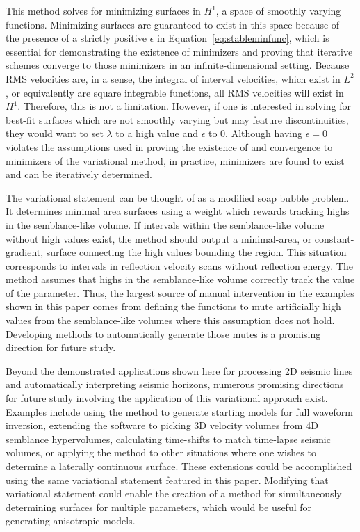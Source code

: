 This method solves for minimizing surfaces in $H^1$, a space of smoothly varying functions.  Minimizing surfaces are guaranteed to exist in this space because of the presence of a strictly positive $\epsilon$ in Equation~\ref{eq:stableminfunc}, which is essential for demonstrating the existence of minimizers and proving that iterative schemes converge to those minimizers in an infinite-dimensional setting.  Because RMS velocities are, in a sense, the integral of interval velocities, which exist in $L^2$, or equivalently are square integrable functions, all RMS velocities will exist in $H^1$. Therefore, this is not a limitation.  However, if one is interested in solving for best-fit surfaces which are not smoothly varying but may feature discontinuities, they would want to set $\lambda$ to a high value and $\epsilon$ to $0$.  Although having $\epsilon = 0$ violates the assumptions used in proving the existence of and convergence to minimizers of the variational method, in practice, minimizers are found to exist and can be iteratively determined.

The variational statement can be thought of as a modified soap bubble problem.  It determines minimal area surfaces using a weight which rewards tracking highs in the semblance-like volume. If intervals within the semblance-like volume without high values exist, the method should output a minimal-area, or constant-gradient, surface connecting the high values bounding the region.  This situation corresponds to intervals in reflection velocity scans without reflection energy. The method assumes that highs in the semblance-like volume correctly track the value of the parameter.  Thus, the largest source of manual intervention in the examples shown in this paper comes from defining the functions to mute artificially high values from the semblance-like volumes where this assumption does not hold.  Developing methods to automatically generate those mutes is a promising direction for future study.

Beyond the demonstrated applications shown here for processing 2D seismic lines and automatically interpreting seismic horizons, numerous promising directions for future study involving the application of this variational approach exist. Examples include using the method to generate starting models for full waveform inversion, extending the software to picking 3D velocity volumes from 4D semblance hypervolumes, calculating time-shifts to match time-lapse seismic volumes, or applying the method to other situations where one wishes to determine a laterally continuous surface.  These extensions could be accomplished using the same variational statement featured in this paper.  Modifying that variational statement could enable the creation of a method for simultaneously determining surfaces for multiple parameters, which would be useful for generating anisotropic models.

